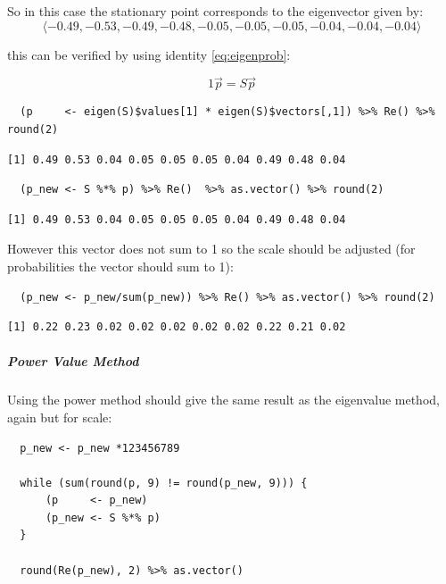 \documentclass[11pt]{article}
\begin{document}
So in this case the stationary point corresponds to the eigenvector given by:
\[
\langle -0.49, -0.53, -0.49, -0.48, -0.05, -0.05, -0.05, -0.04, -0.04, -0.04 \rangle
\]

this can be verified by using identity \eqref{eq:eigenprob}:

$$
1 \vec{p} = S\vec{p}
$$

\lstset{language=r,label= ,caption= ,captionpos=b,numbers=none}
\begin{lstlisting}
  (p     <- eigen(S)$values[1] * eigen(S)$vectors[,1]) %>% Re() %>%  round(2)
\end{lstlisting}

\begin{verbatim}
[1] 0.49 0.53 0.04 0.05 0.05 0.05 0.04 0.49 0.48 0.04
\end{verbatim}


\lstset{language=r,label= ,caption= ,captionpos=b,numbers=none}
\begin{lstlisting}
  (p_new <- S %*% p) %>% Re()  %>% as.vector() %>% round(2)
\end{lstlisting}

\begin{verbatim}
[1] 0.49 0.53 0.04 0.05 0.05 0.05 0.04 0.49 0.48 0.04
\end{verbatim}


However this vector does not sum to 1 so the scale should be adjusted
(for probabilities the vector should sum to 1):

\lstset{language=r,label= ,caption= ,captionpos=b,numbers=none}
\begin{lstlisting}
  (p_new <- p_new/sum(p_new)) %>% Re() %>% as.vector() %>% round(2)
\end{lstlisting}

\begin{verbatim}
[1] 0.22 0.23 0.02 0.02 0.02 0.02 0.02 0.22 0.21 0.02
\end{verbatim}

\subparagraph{Power Value Method}
\label{power-value-method}
Using the power method should give the same result as the eigenvalue method, again but for scale:

\lstset{language=r,label= ,caption= ,captionpos=b,numbers=none}
\begin{lstlisting}
  p_new <- p_new *123456789

  while (sum(round(p, 9) != round(p_new, 9))) {
      (p     <- p_new)
      (p_new <- S %*% p)
  }

  round(Re(p_new), 2) %>% as.vector()
\end{lstlisting}
\end{document}
